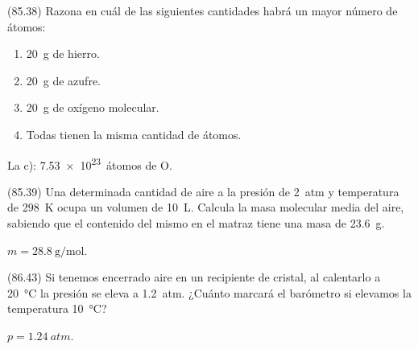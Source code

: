   \begin{exercise}[
      tags    = {},
      topics  = {química,química básica},
      source  = {FQ 1B MGH 2016, p85, e38},
    ]
    (85.38) Razona en cuál de las siguientes cantidades habrá un mayor número de átomos:

    \begin{enumerate}
      \item \SI{20}{\gram} de hierro.
      \item \SI{20}{\gram} de azufre.
      \item \SI{20}{\gram} de oxígeno molecular.
      \item Todas tienen la misma cantidad de átomos.
    \end{enumerate}
  \end{exercise}

  \begin{solution}
    La c): \SI{7.53e23}{átomos} de O.
  \end{solution}




  \begin{exercise}[
      tags    = {},
      topics  = {química,química básica},
      source  = {FQ 1B MGH 2016, p85, e39},
    ]
    (85.39) Una determinada cantidad de aire a la presión de \SI{2}{atm} y
    temperatura de \SI{298}{\kelvin} ocupa un volumen de \SI{10}{\liter}. Calcula la masa molecular media del aire, sabiendo que el contenido del
    mismo en el matraz tiene una masa de \SI{23.6}{\gram}.
  \end{exercise}

  \begin{solution}
    \( m = \SI{28.8}{\gram\per\mole} \).
  \end{solution}




  \begin{exercise}[
      tags    = {},
      topics  = {química,química básica},
      source  = {FQ 1B MGH 2016, p86, e43},
    ]
    (86.43) Si tenemos encerrado aire en un recipiente de cristal, al
    calentarlo a \SI{20}{\celsius} la presión se eleva a \SI{1.2}{atm}. ¿Cuánto marcará el barómetro si elevamos la temperatura \SI{10}{\celsius}?
  \end{exercise}

  \begin{solution}
    \( p = \SI{1.24}{atm} \).
  \end{solution}




